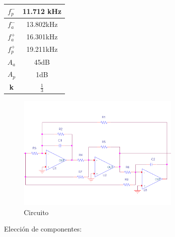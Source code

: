 







\tableofcontents
\newpage

\begin{table}[]
\centering
\begin{tabular}{|c|c|}
\hline
\textbf{$f_p^-$} & 11.712 kHz   \\ \hline
\textbf{$f_a^-$} & 13.802kHz    \\ \hline
\textbf{$f_a^+$} & 16.301kHz    \\ \hline
\textbf{$f_p^+$} & 19.211kHz    \\ \hline
\textbf{$A_a$}   & 45dB         \\ \hline
\textbf{$A_p$}   & 1dB          \\ \hline
\textbf{k}       & $\frac{1}{3}$ \\ \hline
\end{tabular}
\end{table}
	\begin{figure}[H]
	\centering
	\includegraphics[width=0.7\textwidth]{Imagenes/TF.PNG}
	\caption{Circuito }
		\label{fig:circ}
\end{figure}
Elección de componentes:

